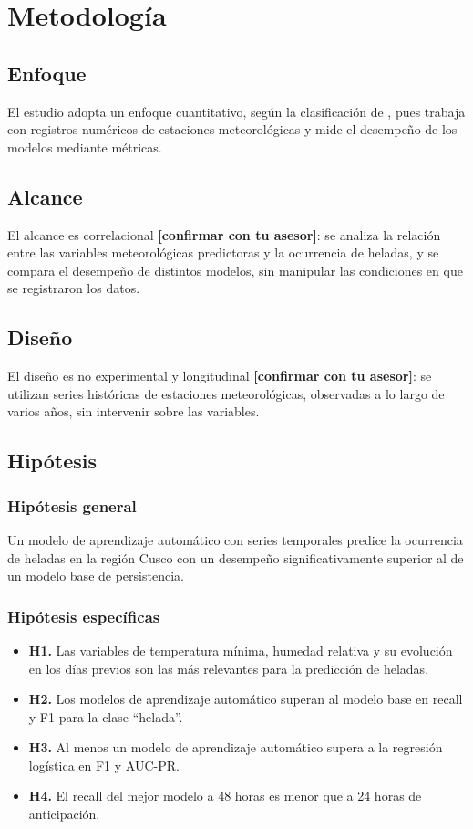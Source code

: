 \section{Metodología}
\label{sec:metodologia}

\subsection{Enfoque}
El estudio adopta un enfoque cuantitativo, según la clasificación de \textcite{hernandez2023}, pues trabaja con registros numéricos de estaciones meteorológicas y mide el desempeño de los modelos mediante métricas.

\subsection{Alcance}
El alcance es correlacional \textbf{[confirmar con tu asesor]}: se analiza la relación entre las variables meteorológicas predictoras y la ocurrencia de heladas, y se compara el desempeño de distintos modelos, sin manipular las condiciones en que se registraron los datos.

\subsection{Diseño}
El diseño es no experimental y longitudinal \textbf{[confirmar con tu asesor]}: se utilizan series históricas de estaciones meteorológicas, observadas a lo largo de varios años, sin intervenir sobre las variables.

\subsection{Hipótesis}

\subsubsection{Hipótesis general}
Un modelo de aprendizaje automático con series temporales predice la ocurrencia de heladas en la región Cusco con un desempeño significativamente superior al de un modelo base de persistencia.

\subsubsection{Hipótesis específicas}
\begin{itemize}
  \item \textbf{H1.} Las variables de temperatura mínima, humedad relativa y su evolución en los días previos son las más relevantes para la predicción de heladas.
  \item \textbf{H2.} Los modelos de aprendizaje automático superan al modelo base en recall y F1 para la clase \enquote{helada}.
  \item \textbf{H3.} Al menos un modelo de aprendizaje automático supera a la regresión logística en F1 y AUC-PR.
  \item \textbf{H4.} El recall del mejor modelo a 48 horas es menor que a 24 horas de anticipación.
\end{itemize}

